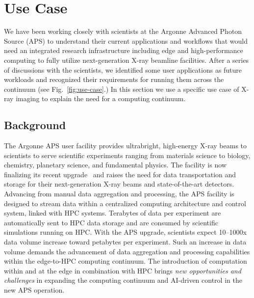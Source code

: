 \section{Use Case} 
\label{sec:usecase}

We have been working closely with scientists at the Argonne Advanced Photon Source (APS) to understand their current applications and workflows that would need an integrated research infrastructure including edge and high-performance computing to fully utilize next-generation X-ray beamline facilities. After a series of discussions with the scientists, we identified some user applications as future workloads and recognized their requirements for running them across the continuum (see Fig.~\ref{fig:use-case}.) 
In this section we use a specific use case of X-ray imaging to explain the need for a computing continuum.

\subsection{Background}

The Argonne APS user facility provides ultrabright, high-energy X-ray beams to
scientists to serve scientific experiments ranging from materials science to
biology, chemistry, planetary science, and fundamental physics. The facility is
now finalizing its recent upgrade~\cite{apsupgrade} and raises the need for
data transportation and storage for their next-generation X-ray beams and
state-of-the-art detectors. Advancing from manual data aggregation and processing,
the APS facility is designed to stream data within a centralized computing
architecture and control system, linked with HPC systems. Terabytes of data per
experiment are automatically sent to HPC data storage and are consumed by
scientific simulations running on HPC. With the APS upgrade, scientists expect
10--1000x data volume increase toward petabytes per experiment. Such an increase
in data volume demands the advancement of data aggregation and processing
capabilities within the edge-to-HPC computing continuum. The introduction of computation within and at
the edge in combination with HPC brings \textit{new opportunities and
challenges} in expanding the computing continuum and AI-driven control in the
new APS operation. 

%


